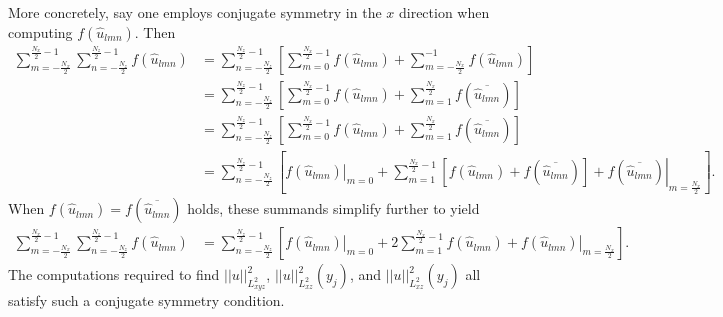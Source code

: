 \documentclass[letterpaper,11pt,nointlimits,reqno]{amsart}
\begin{document}
More concretely, say one employs conjugate symmetry in the $x$ direction
when computing $f\!\left(\hat{u}_{lmn}\right)$.  Then
\begin{align}
  \sum_{m=-\frac{N_x}{2}}^{\frac{N_x}{2}-1}
  \sum_{n=-\frac{N_z}{2}}^{\frac{N_z}{2}-1}
  f\!\left(\hat{u}_{lmn}\right)
&=
  \sum_{n=-\frac{N_z}{2}}^{\frac{N_z}{2}-1}
  \left[
    \sum_{m=0}^{\frac{N_x}{2}-1}
    f\!\left(\hat{u}_{lmn}\right)
    +
    \sum_{m=-\frac{N_x}{2}}^{-1}
    f\!\left(\hat{u}_{lmn}\right)
  \right]
\\ &=
  \sum_{n=-\frac{N_z}{2}}^{\frac{N_z}{2}-1}
  \left[
    \sum_{m=0}^{\frac{N_x}{2}-1}
    f\!\left(\hat{u}_{lmn}\right)
    +
    \sum_{m=1}^{\frac{N_x}{2}}
    f\!\left(\overline{\hat{u}_{lmn}}\right)
  \right]
\\ &=
  \sum_{n=-\frac{N_z}{2}}^{\frac{N_z}{2}-1}
  \left[
    \sum_{m=0}^{\frac{N_x}{2}-1}
    f\!\left(\hat{u}_{lmn}\right)
    +
    \sum_{m=1}^{\frac{N_x}{2}}
    f\!\left(\overline{\hat{u}_{lmn}}\right)
  \right]
\\ &=
  \sum_{n=-\frac{N_z}{2}}^{\frac{N_z}{2}-1}
  \left[
    \left.f\!\left(\hat{u}_{lmn}\right)\right|_{m=0}
    +
    \sum_{m=1}^{\frac{N_x}{2}-1}
    \left[
      f\!\left(\hat{u}_{lmn}\right)
      +
      f\!\left(\overline{\hat{u}_{lmn}}\right)
    \right]
    +
    \left.f\!\left(\overline{\hat{u}_{lmn}}\right)\right|_{m=\frac{N_x}{2}}
  \right]
  .
\end{align}
When $f\!\left(\hat{u}_{lmn}\right) = f\!\left(\overline{\hat{u}_{lmn}}\right)$
holds, these summands simplify further to yield
\begin{align}
  \sum_{m=-\frac{N_x}{2}}^{\frac{N_x}{2}-1}
  \sum_{n=-\frac{N_z}{2}}^{\frac{N_z}{2}-1}
  f\!\left(\hat{u}_{lmn}\right)
&=
  \sum_{n=-\frac{N_z}{2}}^{\frac{N_z}{2}-1}
  \left[
    \left.f\!\left(\hat{u}_{lmn}\right)\right|_{m=0}
    +
    2
    \sum_{m=1}^{\frac{N_x}{2}-1}
      f\!\left(\hat{u}_{lmn}\right)
    +
    \left.f\!\left(\hat{u}_{lmn}\right)\right|_{m=\frac{N_x}{2}}
  \right]
  .
\end{align}
The computations required to find $\left|\left| u
\right|\right|^{2}_{L^{2}_{xyz}}$, $\left|\left| u
\right|\right|^{2}_{L^{2}_{xz}} \!(y_j)$, and $\left|\left| u
\right|\right|^{2}_{L^{2}_{xz}} \!(y_j)$ all satisfy such a conjugate symmetry
condition.
\end{document}
